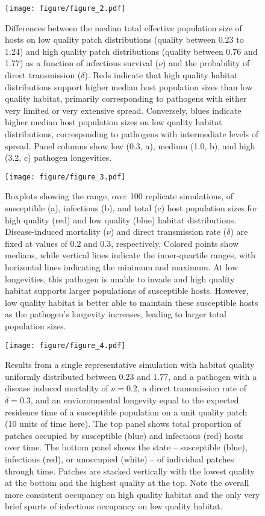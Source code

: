 \documentclass{article}
\begin{document}
\begin{figure}
\texttt{[image: figure/figure\_2.pdf]}
\centering
\caption{Differences between the median total effective population size of hosts on low quality patch distributions (quality between 0.23 to 1.24) and high quality patch distributions (quality between 0.76 and 1.77) as a function of infectious survival ($\nu$) and the probability of direct transmission ($\delta$).  Reds indicate that high quality habitat distributions support higher median host population sizes than low quality habitat, primarily corresponding to pathogens with either very limited or very extensive spread. Conversely, blues indicate higher median host population sizes on low quality habitat distributions, corresponding to pathogens with intermediate levels of spread.  Panel columns show low (0.3, a), medium (1.0, b), and high (3.2, c) pathogen longevities.}
\label{highvlow}
\end{figure}

\begin{figure}
\texttt{[image: figure/figure\_3.pdf]}
\centering
\caption{Boxplots showing the range, over 100 replicate simulations, of susceptible (a), infectious (b), and total (c) host population sizes for high quality (red) and low quality (blue) habitat distributions.  Disease-induced mortality ($\nu$) and direct transmission rate ($\delta$) are fixed at values of 0.2 and 0.3, respectively.  Colored points show medians, while vertical lines indicate the inner-quartile ranges, with horizontal lines indicating the minimum and maximum.  At low longevities, this pathogen is unable to invade and high quality habitat supports larger populations of susceptible hosts.  However, low quality habitat is better able to maintain these susceptible hosts as the pathogen's longevity increases, leading to larger total population sizes.}
\label{popsizes}
\end{figure}

\begin{figure}
\texttt{[image: figure/figure\_4.pdf]}
\centering
\caption{Results from a single representative simulation with habitat quality uniformly distributed between 0.23 and 1.77, and a pathogen with a disease induced mortality of $\nu = 0.2$, a direct transmission rate of $\delta = 0.3$, and an envioronmental longevity equal to the expected residence time of a susceptible population on a unit quality patch (10 units of time here).  The top panel shows total proportion of patches occupied by susceptible (blue) and infectious (red) hosts over time.  The bottom panel shows the state -- susceptible (blue), infectious (red), or unoccupied (white) -- of individual patches through time.  Patches are stacked vertically with the lowest quality at the bottom and the highest quality at the top.  Note the overall more consistent occupancy on high quality habitat and the only very brief spurts of infectious occupancy on low quality habitat.}
\label{simvis}
\end{figure}
\end{document}
